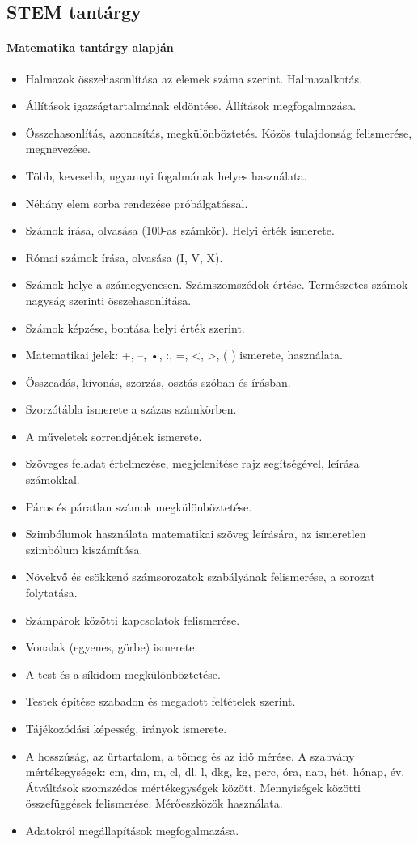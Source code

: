 \subsection{STEM tantárgy}
\paragraph{Matematika tantárgy alapján}
\begin{itemize}
\item Halmazok összehasonlítása az elemek száma szerint. Halmazalkotás.
\item Állítások igazságtartalmának eldöntése. Állítások megfogalmazása.
\item Összehasonlítás, azonosítás, megkülönböztetés. Közös tulajdonság felismerése, megnevezése.
\item Több, kevesebb, ugyannyi fogalmának helyes használata.
\item Néhány elem sorba rendezése próbálgatással.
\item Számok írása, olvasása (100-as számkör). Helyi érték ismerete.
\item Római számok írása, olvasása (I, V, X).
\item Számok helye a számegyenesen. Számszomszédok értése. Természetes számok nagyság szerinti összehasonlítása.
\item Számok képzése, bontása helyi érték szerint.
\item Matematikai jelek: +, –, •, :, =, <, >, ( ) ismerete, használata.
\item Összeadás, kivonás, szorzás, osztás szóban és írásban.
\item Szorzótábla ismerete a százas számkörben.
\item A műveletek sorrendjének ismerete.
\item Szöveges feladat értelmezése, megjelenítése rajz segítségével, leírása számokkal.
\item Páros és páratlan számok megkülönböztetése.
\item Szimbólumok használata matematikai szöveg leírására, az ismeretlen szimbólum kiszámítása.
\item Növekvő és csökkenő számsorozatok szabályának felismerése, a sorozat folytatása.
\item Számpárok közötti kapcsolatok felismerése.
\item Vonalak (egyenes, görbe) ismerete.
\item A test és a síkidom megkülönböztetése.
\item Testek építése szabadon és megadott feltételek szerint.
\item Tájékozódási képesség, irányok ismerete.
\item A hosszúság, az űrtartalom, a tömeg és az idő mérése. A szabvány mértékegységek: cm, dm, m, cl, dl, l, dkg, kg, perc, óra, nap, hét, hónap, év. Átváltások szomszédos mértékegységek között. Mennyiségek közötti összefüggések felismerése. Mérőeszközök használata.
\item Adatokról megállapítások megfogalmazása.
\end{itemize}
